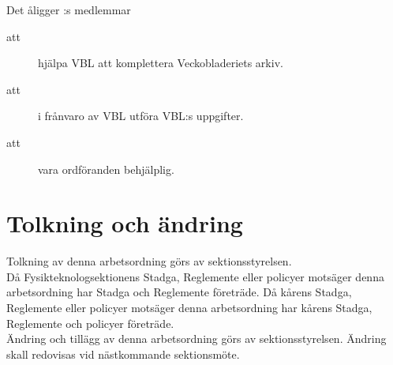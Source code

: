 Det åligger \forening :s medlemmar
\begin{description}
      \item[att] hjälpa VBL att komplettera Veckobladeriets arkiv.
      \item[att] i frånvaro av VBL utföra VBL:s uppgifter.
      \item[att] vara ordföranden behjälplig.
\end{description}
    

\section{Tolkning och ändring}
Tolkning av denna arbetsordning görs av sektionsstyrelsen.\\ Då Fysikteknologsektionens Stadga, Reglemente eller policyer motsäger denna arbetsordning har Stadga och Reglemente företräde. Då kårens Stadga, Reglemente eller policyer motsäger denna arbetsordning har kårens Stadga, Reglemente och policyer företräde.\\
Ändring och tillägg av denna arbetsordning görs av sektionsstyrelsen. Ändring skall redovisas vid nästkommande sektionsmöte. 
\newpage